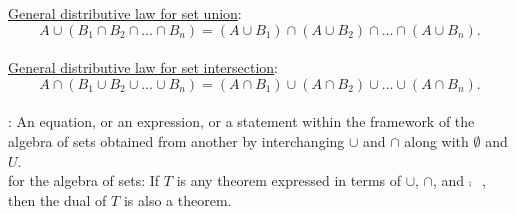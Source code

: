 \documentclass[12pt]{book}
\begin{document}
\underline{General distributive law for set union}: $$A \cup (B_1 \cap B_2 \cap \dots \cap B_n) = (A \cup B_1) \cap (A \cup B_2) \cap \dots \cap (A \cup B_n).$$\\

\underline{General distributive law for set intersection}: $$A \cap (B_1 \cup B_2 \cup \dots \cup B_n) = (A \cap B_1) \cup (A \cap B_2) \cup \dots \cup (A \cap B_n).$$\\

: An equation, or an expression, or a statement within the framework of the algebra of sets obtained from another by interchanging $\cup$ and $\cap$ along with $\emptyset$ and $U$.\\

 for the algebra of sets: If $T$ is any theorem expressed in terms of $\cup$, $\cap$, and $\comp{\phantom{A}}$, then the dual of $T$ is also a theorem.\\
\end{document}
